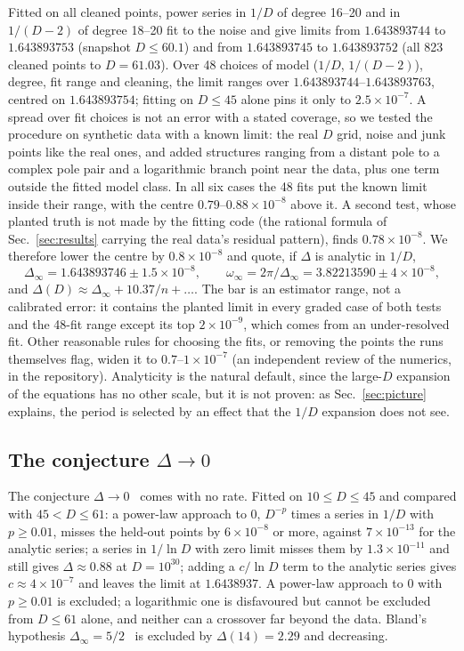 \documentclass[aps,prd,onecolumn,superscriptaddress,nofootinbib,10pt]{revtex4-2}
\newcommand{\Dinf}{\Delta_\infty}
\begin{document}
Fitted on all cleaned points, power series in $1/D$ of degree 16--20 and in $1/(D-2)$ of degree 18--20 fit to the
noise and give limits from $1.643893744$ to $1.643893753$ (snapshot $D \le 60.1$) and from $1.643893745$ to
$1.643893752$ (all 823 cleaned points to $D = 61.03$). Over 48 choices of model ($1/D$, $1/(D-2)$), degree, fit range
and cleaning, the limit ranges over $1.643893744$--$1.643893763$, centred on $1.643893754$; fitting on $D \le 45$ alone
pins it only to $2.5\times10^{-7}$. A spread over fit choices is not an error with a stated coverage, so we tested the
procedure on synthetic data with a known limit: the real $D$ grid, noise and junk points like the real ones, and added
structures ranging from a distant pole to a complex pole pair and a logarithmic branch point near the data, plus one
term outside the fitted model class. In all six cases the 48 fits put the known limit inside their range, with the
centre $0.79$--$0.88\times10^{-8}$ above it. A second test, whose planted truth is not made by the fitting code (the
rational formula of Sec.~\ref{sec:results} carrying the real data's residual pattern), finds $0.78\times10^{-8}$. We
therefore lower the centre by $0.8\times10^{-8}$ and quote, if $\Delta$ is analytic in $1/D$,
\begin{equation}
\Dinf = 1.643893746 \pm 1.5\times10^{-8}, \qquad \omega_\infty = 2\pi/\Dinf = 3.82213590 \pm 4\times10^{-8},
\label{eq:dinf}
\end{equation}
and $\Delta(D) \approx \Dinf + 10.37/n + \dots$. The bar is an estimator range, not a calibrated error: it contains
the planted limit in every graded case of both tests and the 48-fit range except its top $2\times10^{-9}$, which comes from an under-resolved fit. Other
reasonable rules for choosing the fits, or removing the points the runs themselves flag, widen it to
$0.7$--$1\times10^{-7}$ (an independent review of the numerics, in the repository). Analyticity is the natural default, since the large-$D$ expansion of the equations has
no other scale, but it is not proven: as Sec.~\ref{sec:picture} explains, the period is selected by an effect that the
$1/D$ expansion does not see.

\subsection{The conjecture $\Delta \to 0$}

The conjecture $\Delta \to 0$~\cite{EckerEckerGrumiller2026,EckerEtAl2026} comes with no rate. Fitted on
$10 \le D \le 45$ and compared with $45 < D \le 61$: a power-law approach to 0, $D^{-p}$ times a series in $1/D$ with
$p \ge 0.01$, misses the held-out points by $6\times10^{-8}$ or more, against $7\times10^{-13}$ for the analytic series;
a series in $1/\ln D$ with zero limit misses them by $1.3\times10^{-11}$ and still gives $\Delta \approx 0.88$ at
$D = 10^{30}$; adding a $c/\ln D$ term to the analytic series gives $c \approx 4\times10^{-7}$ and leaves the limit at
$1.6438937$. A power-law approach to 0 with $p \ge 0.01$ is excluded; a logarithmic one is disfavoured but cannot be
excluded from $D \le 61$ alone, and neither can a crossover far beyond the data. Bland's hypothesis
$\Dinf = 5/2$~\cite{Bland2007} is excluded by $\Delta(14) = 2.29$ and decreasing.
\end{document}
